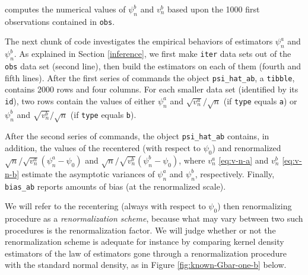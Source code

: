 \documentclass[11pt,openright,twoside]{book}
\theoremstyle{definition}
\theoremstyle{definition}
\theoremstyle{definition}
\theoremstyle{remark}
\begin{document}
computes the numerical values of \(\psi_{n}^{b}\) and \(v_{n}^{b}\) based
upon the 1000 first observations contained in \texttt{obs}.

The next chunk of code investigates the empirical behaviors of estimators
\(\psi_{n}^{a}\) and \(\psi_{n}^{b}\). As explained in Section \ref{inference},
we first make \texttt{iter} data sets out of the \texttt{obs} data set (second line), then
build the estimators on each of them (fourth and fifth lines). After the first
series of commands the object \texttt{psi\_hat\_ab}, a \texttt{tibble}, contains 2000
rows and four columns. For each smaller data set (identified by its \texttt{id}),
two rows contain the values of either \(\psi_{n}^{a}\) and
\(\sqrt{v_{n}^{a}}/\sqrt{n}\) (if \texttt{type} equals \texttt{a}) or \(\psi_{n}^{b}\) and
\(\sqrt{v_{n}^{b}}/\sqrt{n}\) (if \texttt{type} equals \texttt{b}).

After the second series of commands, the object \texttt{psi\_hat\_ab} contains, in
addition, the values of the recentered (with respect to \(\psi_{0}\)) and
renormalized \(\sqrt{n}/\sqrt{v_{n}^{a}} (\psi_{n}^{a} - \psi_{0})\) and
\(\sqrt{n}/\sqrt{v_{n}^{b}} (\psi_{n}^{b} - \psi_{0})\), where \(v_{n}^{a}\)
\eqref{eq:v-n-a} and \(v_{n}^{b}\) \eqref{eq:v-n-b} estimate the asymptotic
variances of \(\psi_{n}^{a}\) and \(\psi_{n}^{b}\), respectively. Finally,
\texttt{bias\_ab} reports amounts of bias (at the renormalized scale).

We will refer to the recentering (always with respect to \(\psi_{0}\)) then
renormalizing procedure as a \emph{renormalization scheme}, because what may vary
between two such procedures is the renormalization factor. We will judge
whether or not the renormalization scheme is adequate for instance by
comparing kernel density estimators of the law of estimators gone through a
renormalization procedure with the standard normal density, as in Figure
\ref{fig:known-Gbar-one-b} below.
\end{document}
